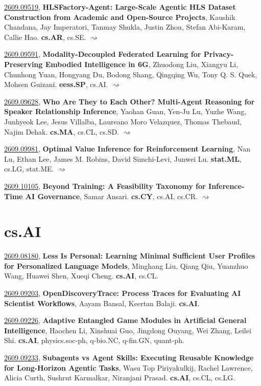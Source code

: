 \documentclass[9pt, a4paper]{article}
\theoremstyle{plain}
\theoremstyle{definition}
\theoremstyle{remark}
\newcommand{\arxivwithtarget}[3]{\hypertarget{#1}{}\href{https://arxiv.org/abs/#1}{#1}, \textbf{\textcolor{arxivblue}{#2}}, #3. }
\newcommand{\arxiv}[3]{\href{https://arxiv.org/abs/#1}{#1}, \textbf{\textcolor{arxivblue}{#2}}, #3. }
\begin{document}
\arxiv{2609.09519}{HLSFactory-Agent: Large-Scale Agentic HLS Dataset Construction from Academic and Open-Source Projects}{Kaushik Chandana, Jay Imperatori, Tanmay Shukla, Justin Zhou, Stefan Abi-Karam, Callie Hao}\textbf{cs.AR}, cs.SE. \hyperlink{2609.09519}{$\rightsquigarrow$}

\arxiv{2609.09591}{Modality-Decoupled Federated Learning for Privacy-Preserving Embodied Intelligence in 6G}{Zhuodong Liu, Xiangyu Li, Chunhong Yuan, Hongyang Du, Bodong Shang, Qingqing Wu, Tony Q. S. Quek, Mohsen Guizani}\textbf{eess.SP}, cs.AI. \hyperlink{2609.09591}{$\rightsquigarrow$}

\arxiv{2609.09628}{Who Are They to Each Other? Multi-Agent Reasoning for Speaker Relationship Inference}{Yaohan Guan, Yen-Ju Lu, Yuzhe Wang, Junhyeok Lee, Jesus Villalba, Laureano Moro Velazquez, Thomas Thebaud, Najim Dehak}\textbf{cs.MA}, cs.CL, cs.SD. \hyperlink{2609.09628}{$\rightsquigarrow$}

\arxiv{2609.09981}{Optimal Value Inference for Reinforcement Learning}{Nan Lu, Ethan Lee, James M. Robins, David Simchi-Levi, Junwei Lu}\textbf{stat.ML}, cs.LG, stat.ME. \hyperlink{2609.09981}{$\rightsquigarrow$}

\arxiv{2609.10105}{Beyond Training: A Feasibility Taxonomy for Inference-Time AI Governance}{Samar Ansari}\textbf{cs.CY}, cs.AI, cs.CR. \hyperlink{2609.10105}{$\rightsquigarrow$}


\section{cs.AI}
\arxivwithtarget{2609.08180}{Less Is Personal: Learning Minimal Sufficient User Profiles for Personalized Language Models}{Minghang Liu, Qiang Qiu, Yuanzhuo Wang, Huawei Shen, Xueqi Cheng}\textbf{cs.AI}, cs.CL.



\arxivwithtarget{2609.09203}{OpenDiscoveryTrace: Process Traces for Evaluating AI Scientist Workflows}{Aayam Bansal, Keertan Balaji}\textbf{cs.AI}.



\arxivwithtarget{2609.09226}{Adaptive Entangled Game Modules in Artificial General Intelligence}{Haochen Li, Xinshuai Guo, Jingdong Ouyang, Wei Zhang, Leilei Shi}\textbf{cs.AI}, physics.soc-ph, q-bio.NC, q-fin.GN, quant-ph.



\arxivwithtarget{2609.09233}{Subagents vs Agent Skills: Executing Reusable Knowledge for Long-Horizon Agentic Tasks}{Wasu Top Piriyakulkij, Rachel Lawrence, Alicia Curth, Sushrut Karmalkar, Niranjani Prasad}\textbf{cs.AI}, cs.CL, cs.LG.
\end{document}

